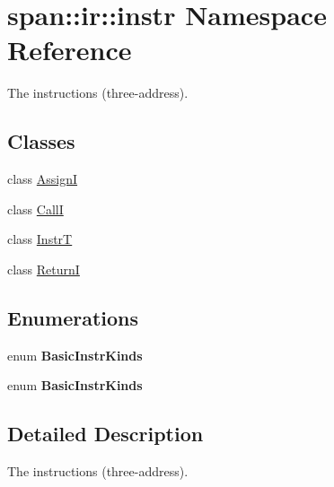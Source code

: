\hypertarget{namespacespan_1_1ir_1_1instr}{}\section{span\+:\+:ir\+:\+:instr Namespace Reference}
\label{namespacespan_1_1ir_1_1instr}


The instructions (three-\/address).  


\subsection*{Classes}
\begin{DoxyCompactItemize}
\item 
class \hyperlink{classspan_1_1ir_1_1instr_1_1AssignI}{AssignI}
\item 
class \hyperlink{classspan_1_1ir_1_1instr_1_1CallI}{CallI}
\item 
class \hyperlink{classspan_1_1ir_1_1instr_1_1InstrT}{InstrT}
\item 
class \hyperlink{classspan_1_1ir_1_1instr_1_1ReturnI}{ReturnI}
\end{DoxyCompactItemize}
\subsection*{Enumerations}
\begin{DoxyCompactItemize}
\item 
\mbox{\label{namespacespan_1_1ir_1_1instr_af6a41ddebecd6d09330dcfdd45061b34}} 
enum {\bfseries Basic\+Instr\+Kinds} 
\item 
\mbox{\label{namespacespan_1_1ir_1_1instr_af6a41ddebecd6d09330dcfdd45061b34}} 
enum {\bfseries Basic\+Instr\+Kinds} 
\end{DoxyCompactItemize}


\subsection{Detailed Description}
The instructions (three-\/address). 